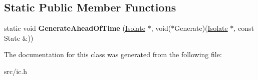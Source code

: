 \subsection*{Static Public Member Functions}
\begin{DoxyCompactItemize}
\item 
\hypertarget{classv8_1_1internal_1_1_call_i_c_1_1_b_a_s_e___e_m_b_e_d_d_e_d_aa49f326def395497f9da53d7e453f03e}{}static void {\bfseries Generate\+Ahead\+Of\+Time} (\hyperlink{classv8_1_1internal_1_1_isolate}{Isolate} $\ast$, void($\ast$Generate)(\hyperlink{classv8_1_1internal_1_1_isolate}{Isolate} $\ast$, const State \&))\label{classv8_1_1internal_1_1_call_i_c_1_1_b_a_s_e___e_m_b_e_d_d_e_d_aa49f326def395497f9da53d7e453f03e}

\end{DoxyCompactItemize}


The documentation for this class was generated from the following file\+:\begin{DoxyCompactItemize}
\item 
src/ic.\+h\end{DoxyCompactItemize}
